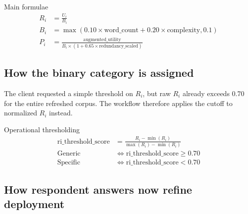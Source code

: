 \documentclass[12pt]{article}
\begin{document}
\begin{psidbox}{Main formulae}
\begin{align*}
R_i &= \frac{U_i}{B_i} \\
B_i &= \max(0.10 \times \text{word\_count} + 0.20 \times \text{complexity}, 0.1) \\
P_i &= \frac{\text{augmented\_utility}}{B_i \times (1 + 0.65 \times \text{redundancy\_scaled})}
\end{align*}
\end{psidbox}

\subsection{How the binary category is assigned}

The client requested a simple threshold on $R_i$, but raw $R_i$ already exceeds 0.70 for the entire refreshed corpus. The workflow therefore applies the cutoff to normalized $R_i$ instead.

\begin{psidbox}{Operational thresholding}
\begin{align*}
\text{ri\_threshold\_score} &= \frac{R_i - \min(R_i)}{\max(R_i) - \min(R_i)} \\
\text{Generic} &\iff \text{ri\_threshold\_score} \geq 0.70 \\
\text{Specific} &\iff \text{ri\_threshold\_score} < 0.70
\end{align*}
\end{psidbox}

\subsection{How respondent answers now refine deployment}
\end{document}
